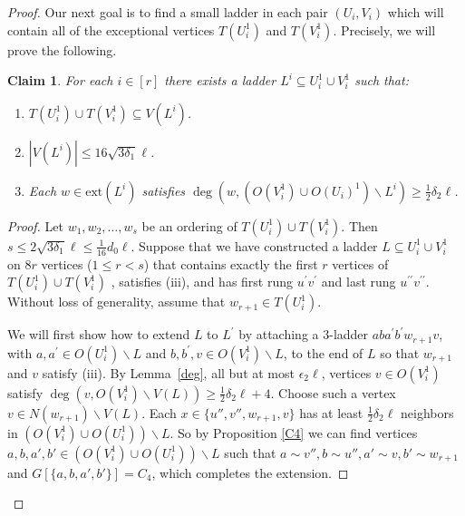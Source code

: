 \documentclass[oneside,12pt]{memoir}
\newtheorem{claim}[theorem]{Claim}
\newcommand{\ep}{\epsilon}
\newcommand{\half}{\frac{1}{2}}
\newcommand{\ssm}{\smallsetminus}
\newcommand{\ext}{\mathrm{ext}}
\begin{document}
\begin{proof}
Our next goal is to find a small ladder in each pair $(U_i,V_i)$ which will contain all of the exceptional vertices $T(U_i^1)$ and $T(V_i^1)$.  Precisely, we will prove the following.
\begin{claim}\label{smalllader} 
For each $i\in [r]$ there exists a ladder $L^i\subseteq U_i^1\cup V_i^1$ 
such that:
\begin{enumerate}
\item  $T(U_i^1)\cup T(V_i^1)\subseteq V(L^i) $.
\item  $|V(L^i)| \leq 16\sqrt{3\delta_{1}}\ell$.
\item  Each $w\in \ext(L^{i})$ satisfies %
$\deg(w, (O(V_{i}^1)\cup O(U_{i})^1) \smallsetminus L^{i})\ge  \frac{1}{2}\delta_2\ell$.
\end{enumerate}
\end{claim}



\begin{proof}
Let $w_{1},w_{2},\dots ,w_{s}$ be an ordering of $T(U_i^1) \cup T(V_i^1)$.
Then $s\leq 2\sqrt{3\delta _{1}}\ell\le \frac{1}{16}d_0\ell$. Suppose that we have constructed a ladder $L\subseteq U_{i}^1\cup V_{i}^1$
on $8r$ vertices ($1\leq r<s$) that contains exactly the first $r$
vertices of  $T(U_i^1) \cup T(V_i^1)$
, satisfies (iii), and has
first rung $u^{\prime }v^{\prime }$ and last rung $u^{\prime \prime
}v^{\prime \prime }$. Without loss of generality, assume that $w_{r+1}\in
T(U_{i}^1)$. 

We will first show how to extend $L$ to $L^{\prime }$ by attaching a $3$-ladder $aba^{\prime }b^{\prime }w_{r+1}v$, with $a,a^{\prime }\in O(U_{i}^1)\smallsetminus L$ and $b,b^{\prime },v\in
O(V_{i}^1)\smallsetminus L$, to the end of $L$ so that $w_{r+1}$ and $v$
satisfy (iii). By Lemma~\ref{deg}, all but at most $\ep_2\ell$, vertices $v\in O(V_i^1)$ satisfy $\deg(v,O(V_i^1)\ssm V(L))\ge \frac{1}{2}\delta_2\ell +4$.
Choose such a vertex $v\in N(w_{r+1})\ssm V(L)$. Each $x\in \{u'',v'',w_{r+1},v\}$ has at least $\half\delta_2\ell$ neighbors in  
$(O(V_{i}^1)\cup O(U_{i}^1)) \smallsetminus L$.
So by Proposition \ref{C4} 
we can find vertices $a,b,a',b'\in \left( O(V_{i}^1)\cup O(U_{i}^1)\right) \smallsetminus L $ such that $a\sim v'',b\sim u'',a'\sim v,b'\sim w_{r+1}$ and $G[\{a,b,a',b'\}]=C_4$,
which completes the extension.


\end{proof}
\end{proof}
\end{document}
